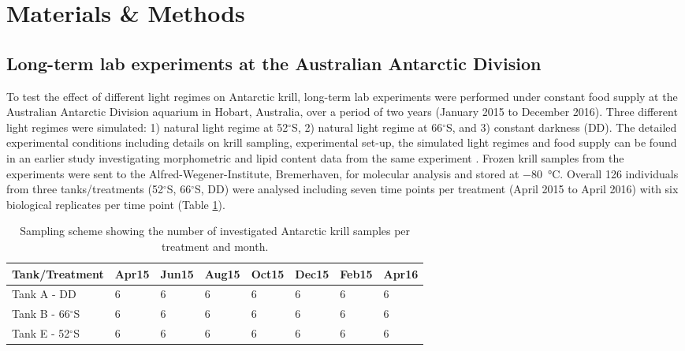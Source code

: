 \section{Materials \& Methods}
\subsection{Long-term lab experiments at the Australian Antarctic Division}

To test the effect of different light regimes on Antarctic krill, long-term lab
experiments were performed under constant food supply at the Australian
Antarctic Division aquarium in Hobart, Australia, over a period of two years
(January 2015 to December 2016). Three different light regimes were simulated:
1) natural light regime at 52$^{\circ}$S, 2) natural light regime at
66$^{\circ}$S, and 3) constant darkness (DD). The detailed experimental
conditions including details on krill sampling, experimental set-up, the
simulated light regimes and food supply can be found in an earlier study
investigating morphometric and lipid content data from the same experiment
\citep{horing_light_2018}. Frozen krill samples from the experiments were sent
to the Alfred-Wegener-Institute, Bremerhaven, for molecular analysis and stored
at \SI{-80}{\celsius}. Overall 126 individuals from three tanks/treatments
(52$^{\circ}$S, 66$^{\circ}$S, DD) were analysed including seven time points
per treatment (April 2015 to April 2016) with six biological replicates per
time point (Table \ref{pub3_table1}). 

\begin{table}[]
\caption{Sampling scheme showing the number of investigated Antarctic krill
samples per treatment and month.}
\label{pub3_table1}
\begin{tabular}{@{}llllllll@{}}
\toprule
\textbf{Tank/Treatment} & \textbf{Apr15} & \textbf{Jun15} & \textbf{Aug15} & \textbf{Oct15} & \textbf{Dec15} & \textbf{Feb15} & \textbf{Apr16} \\ \midrule
Tank A - DD             & 6              & 6              & 6              & 6              & 6              & 6              & 6              \\
        Tank B - 66$^{\circ}$S           & 6              & 6              & 6              & 6              & 6              & 6              & 6              \\
        Tank E - 52$^{\circ}$S           & 6              & 6              & 6              & 6              & 6              & 6              & 6              \\ \bottomrule
\end{tabular}
\end{table}

